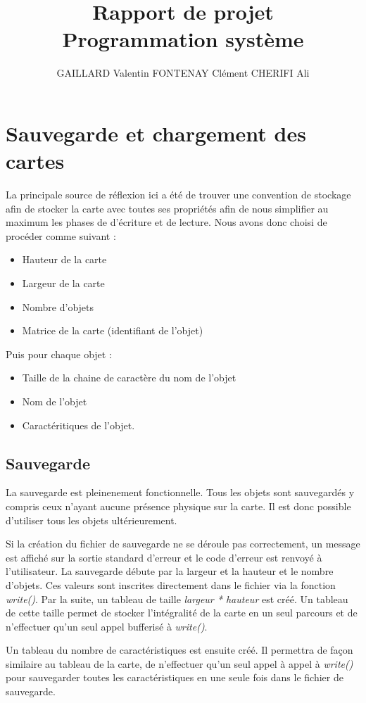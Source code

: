 \documentclass[10pt,a4paper]{article}
\author{GAILLARD Valentin FONTENAY Clément CHERIFI Ali}
\title{Rapport de projet\\Programmation système}
\begin{document}
\maketitle
\newpage
\tableofcontents
\newpage

\section{Sauvegarde et chargement des cartes}
La principale source de réflexion ici a été de trouver une convention de stockage afin de stocker la carte avec toutes ses propriétés afin de nous simplifier au maximum les phases de d'écriture et de lecture.
Nous avons donc choisi de procéder comme suivant : 
\begin{itemize}
\item Hauteur de la carte
\item Largeur de la carte
\item Nombre d'objets
\item Matrice de la carte (identifiant de l'objet)
\end{itemize}
Puis pour chaque objet : 
\begin{itemize}
\item Taille de la chaine de caractère du nom de l'objet 
\item Nom de l'objet 
\item Caractéritiques de l'objet.
\end{itemize}
\subsection{Sauvegarde}

	La sauvegarde est pleinenement fonctionnelle. Tous les objets sont sauvegardés y compris ceux n'ayant aucune présence physique sur la carte. Il est donc possible d'utiliser tous les objets ultérieurement.
	
	Si la création du fichier de sauvegarde ne se déroule pas correctement, un message est affiché sur la sortie standard d'erreur et le code d'erreur est renvoyé à l'utilisateur.
	La sauvegarde débute par la largeur et la hauteur et le nombre d'objets. Ces valeurs sont inscrites directement dans le fichier via la fonction \textit{write()}. 
	Par la suite, un tableau de taille \textit{largeur * hauteur} est créé. Un tableau de cette taille permet de stocker l'intégralité de la carte en un seul parcours et de n'effectuer qu'un seul appel bufferisé à \textit{write()}.
	
	Un tableau du nombre de caractéristiques est ensuite créé. Il permettra de façon similaire au tableau de la carte, de n'effectuer qu'un seul appel à appel à \textit{write()} pour sauvegarder toutes les caractéristiques en une seule fois dans le fichier de sauvegarde.
\end{document}
